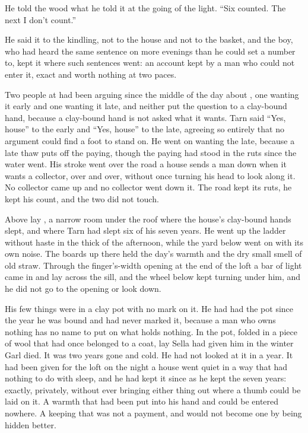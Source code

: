 He told the wood what he told it at the going of the light. “Six counted. The next I don't count.”

He said it to the kindling, not to the house and not to the basket, and the boy, who had heard the same sentence on more evenings than he could set a number to, kept it where such sentences went: an account kept by a man who could not enter it, exact and worth nothing at two paces.

Two people at  had been arguing since the middle of the day about , one wanting it early and one wanting it late, and neither put the question to a clay-bound hand, because a clay-bound hand is not asked what it wants. Tarn said “Yes, house” to the early and “Yes, house” to the late, agreeing so entirely that no argument could find a foot to stand on. He went on wanting the late, because a late thaw puts off the paying, though the paying had stood in the ruts since the water went. His stroke went over the road a house sends a man down when it wants a collector, over and over, without once turning his head to look along it. No collector came up  and no collector went down it. The road kept its ruts, he kept his count, and the two did not touch.

\scenebreak

Above  lay , a narrow room under the roof where the house's clay-bound hands slept, and where Tarn had slept six of his seven years. He went up the ladder without haste in the thick of the afternoon, while the yard below went on with its own noise. The boards up there held the day's warmth and the dry small smell of old straw. Through the finger's-width opening at the end of the loft a bar of light came in and lay across the sill, and the wheel below kept turning under him, and he did not go to the opening or look down.

His few things were in a clay pot with no mark on it. He had had the pot since the year he was bound and had never marked it, because a man who owns nothing has no name to put on what holds nothing. In the pot, folded in a piece of wool that had once belonged to a coat, lay  Sella had given him in the winter Garl died. It was two years gone and cold. He had not looked at it in a year. It had been given for the loft on the night a house went quiet in a way that had nothing to do with sleep, and he had kept it since as he kept the seven years: exactly, privately, without ever bringing either thing out where a thumb could be laid on it. A warmth that had been put into his hand and could be entered nowhere. A keeping that was not a payment, and would not become one by being hidden better.

